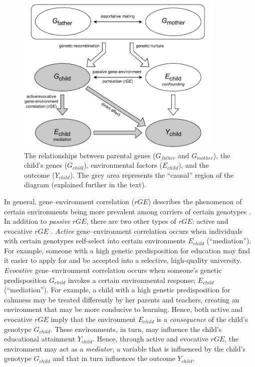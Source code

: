 \documentclass[12pt,a4paper]{article}
\begin{document}
\begin{bibunit}
\begin{figure}[ht]
    \centering
\includegraphics[width=10cm]{include/GxEtest_alt3.drawio.pdf}

    \caption{The relationships between parental genes ($G_{father}$ and $G_{mother}$), the child's genes ($G_{child}$), environmental factors ($E_{child}$), and the outcome ($Y_{child}$). The grey area represents the ``causal'' region of the diagram (explained further in the text).
    }
    \label{fig:diagram}
\end{figure}

In general, gene--environment correlation ($rGE$) describes the phenomenon of certain environments being more prevalent among carriers of certain genotypes \citep{Plomin1977,Fletcher2013}. In addition to \textit{passive} $rGE$, there are two other types of $rGE$: active and evocative $rGE$ \citep{Plomin1977}. \textit{Active} gene--environment correlation occurs when individuals with certain genotypes self-select into certain environments $E_{child}$  (``mediation''). For example, someone with a high genetic predisposition for education may find it easier to apply for and be accepted into a selective, high-quality university. \textit{Evocative} gene--environment correlation occurs when someone's genetic predisposition $G_{child}$ invokes a certain environmental response; $E_{child}$ (``mediation''). For example, a child with a high genetic predisposition for calmness may be treated differently by her parents and teachers, creating an environment that may be more conducive to learning. Hence, both active and evocative $rGE$ imply that the environment $E_{child}$ is a \textit{consequence} of the child's genotype $G_{child}$. These environments, in turn, may influence the child's educational attainment $Y_{child}$. Hence, through active and evocative $rGE$, the environment may act as a \textit{mediator}, a variable that is influenced by the child's genotype $G_{child}$ and that in turn influences the outcome $Y_{child}$.


\end{bibunit}
\end{document}
